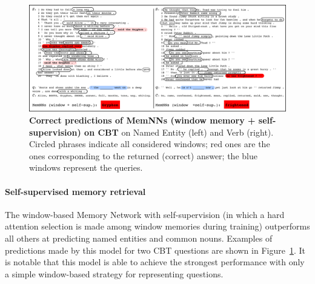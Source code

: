 


%

\begin{figure}[ht]
\newcommand{\mc}[1]{\multicolumn{2}{l}{#1}}
  \begin{center}
   \includegraphics[width=\textwidth]{Chapter_6/cbt_fig2.png}
      \caption{\label{tab:ex_pred_cbt} {\bf Correct predictions of
          MemNNs (window memory + self-supervision) on CBT} on Named Entity (left) and
          Verb (right). Circled phrases indicate all considered
          windows; red ones are the ones corresponding to the returned
          (correct) answer; the blue windows represent the queries.}\label{tab:ex_pred_cbt}
    \end{center}
  \vspace*{-2ex}
\end{figure}


\paragraph{Self-supervised memory retrieval} 
%
The window-based Memory Network with self-supervision (in which a hard attention selection 
is made among window memories during training)
outperforms all others at predicting named entities and common nouns.
%
%
Examples of predictions made by this model for two CBT questions are shown
in Figure~\ref{tab:ex_pred_cbt}. It is notable that this model is able to achieve the strongest performance with only a simple window-based strategy for representing questions. 
%

